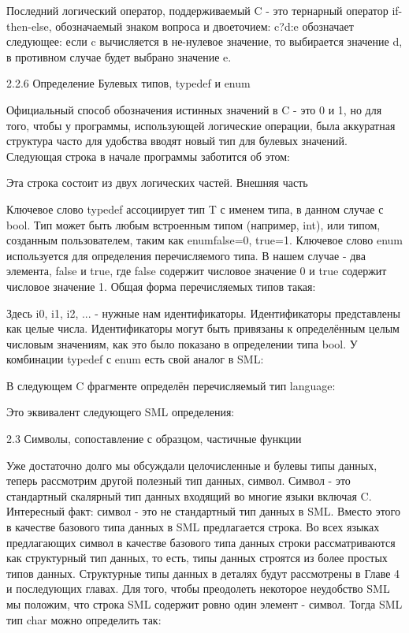 Последний логический оператор, поддерживаемый C - это тернарный оператор if-then-else, обозначаемый знаком вопроса и двоеточием: c?d:e обозначает следующее: если c вычисляется в не-нулевое значение, то выбирается значение d, в противном случае будет выбрано значение e.

2.2.6 Определение Булевых типов, typedef и enum

Официальный способ обозначения истинных значений в C - это 0 и 1, но для того, чтобы у программы, использующей логические операции, была аккуратная структура часто для удобства вводят новый тип для булевых значений. Следующая строка в начале программы заботится об этом:

Эта строка состоит из двух логических частей. Внешняя часть

Ключевое слово typedef ассоциирует тип T с именем типа, в данном случае с bool. Тип может быть любым встроенным типом (например, int), или типом, созданным пользователем, таким как enum{false=0, true=1}. Ключевое слово enum используется для определения перечисляемого типа. В нашем случае - два элемента, false и true, где false содержит числовое значение 0 и true содержит числовое значение 1. Общая форма перечисляемых типов такая:

Здесь i0, i1, i2, ... - нужные нам идентификаторы. Идентификаторы представлены как целые числа. Идентификаторы могут быть привязаны к определённым целым числовым значениям, как это было показано в определении типа bool. У комбинации typedef с enum есть свой аналог в SML:

В следующем C фрагменте определён перечисляемый тип language:

Это эквивалент следующего SML определения:

2.3 Символы, сопоставление с образцом, частичные функции

Уже достаточно долго мы обсуждали целочисленные и булевы типы данных, теперь рассмотрим другой полезный тип данных, символ. Символ - это стандартный скалярный тип данных входящий во многие языки включая C. Интересный факт: символ - это не стандартный тип данных в SML. Вместо этого в качестве базового типа данных в SML предлагается строка. Во всех языках предлагающих символ в качестве базового типа данных строки рассматриваются как структурный тип данных, то есть, типы данных строятся из более простых типов данных. Структурные типы данных в деталях будут рассмотрены в Главе 4 и последующих главах. Для того, чтобы преодолеть некоторое неудобство SML мы положим, что строка SML содержит ровно один элемент - символ. Тогда SML тип char можно определить так:

